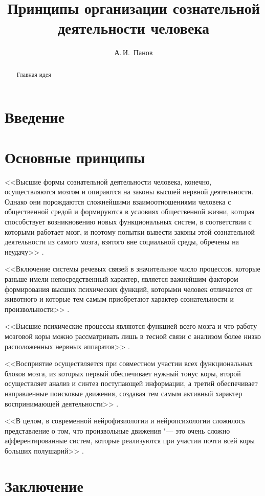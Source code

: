 \documentclass[a4paper,12pt]{article}
\begin{document}
	\title{Принципы организации сознательной деятельности человека}
	\author{А.\,И.~Панов}
	
	\maketitle{}
	
	\begin{abstract}
		Главная идея
	\end{abstract}
	
	\section*{Введение}

	\section{Основные принципы}
	
	<<Высшие формы сознательной деятельности человека, конечно, осуществляются мозгом и опираются на законы высшей нервной деятельности. Однако они порождаются сложнейшими взаимоотношениями человека с общественной средой и формируются в условиях общественной жизни, которая способствует возникновению новых функциональных систем, в соответствии с которыми работает мозг, и поэтому попытки вывести законы этой сознательной деятельности из самого мозга, взятого вне социальной среды, обречены на неудачу>> \cite{Luria1977}.
	
	<<Включение системы речевых связей в значительное число процессов, которые раньше имели непосредственный характер, является важнейшим фактором формирования высших психических функций, которыми человек отличается от животного и которые тем самым приобретают характер сознательности и произвольности>> \cite{Luria2000}.
	
	<<Высшие психические процессы являются функцией всего мозга и что работу мозговой коры можно рассматривать лишь в тесной связи с анализом более низко расположенных нервных аппаратов>> \cite{Luria2000}.
	
	<<Восприятие осуществляется при совместном участии всех функциональных блоков мозга, из которых первый обеспечивает нужный тонус коры, второй осуществляет анализ и синтез поступающей информации, а третий обеспечивает направленные поисковые движения, создавая тем самым активный характер воспринимающей деятельности>> \cite{Luria2003}.
	
	<<В целом, в современной нейрофизиологии и нейропсихологии сложилось представление о том, что произвольные движения "--- это очень сложно афферентированные систем, которые реализуются при участии почти всей коры больших полушарий>> \cite{Homskaya2015}.
	
	\section*{Заключение}
	
   \printbibliography
\end{document}
